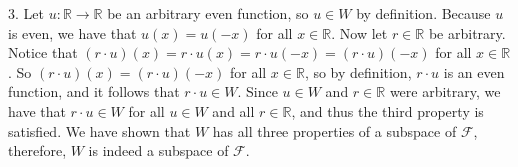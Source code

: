 \documentclass[12pt]{article}
\newenvironment{problem}[2][Problem]
{
	\begin{trivlist} 
		\item[\hskip \labelsep {\bfseries #1 #2:}]
	}
{
	\end{trivlist}
	}
\newenvironment{solution}[1][Solution]
{
	\begin{trivlist} 
		\item[\hskip \labelsep {\itshape #1:}]
	}
	{
	\end{trivlist}
}
\begin{document}
\begin{problem}{6}
\begin{solution}
3. Let $u: \mathbb{R} \to \mathbb{R}$ be an arbitrary even function, so $u \in W$ by definition. Because $u$ is even, we have that $u(x) = u(-x)$ for all $x \in \mathbb{R}$. Now let $r \in \mathbb{R}$ be arbitrary. Notice that $(r\cdot u)(x) = r\cdot u(x) = r\cdot u(-x) = (r\cdot u)(-x)$ for all $x \in \mathbb{R}$. So $(r\cdot u)(x) = (r\cdot u)(-x)$ for all $x \in \mathbb{R}$, so by definition, $r\cdot u$ is an even function, and it follows that $r\cdot u \in W$. Since $u \in W$ and  $r\in \mathbb{R}$ were arbitrary, we have that $r \cdot u \in W$ for all $u \in W$ and all $r \in \mathbb{R}$, and thus the third property is satisfied. 
\noindent
\newline
\newline
We have shown that $W$ has all three properties of a subspace of $\mathcal{F}$, therefore, $W$ is indeed a subspace of $\mathcal{F}$.
\end{solution}
\end{problem}
\end{document}
